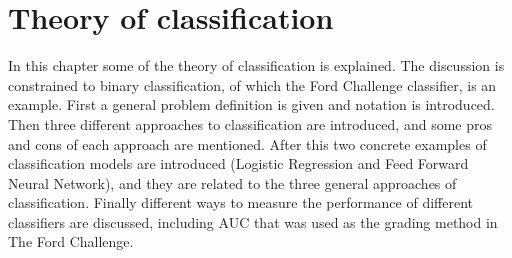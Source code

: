 \chapter{Theory of classification}
In this chapter some of the theory of classification is explained. The discussion is constrained to binary classification, of which the Ford Challenge classifier, is an example. First a general problem definition is given and notation is introduced. Then three different approaches to classification are introduced, and some pros and cons of each approach are mentioned. After this two concrete examples of classification models are introduced (Logistic Regression and Feed Forward Neural Network), and they are related to the three general approaches of classification. Finally different ways to measure the performance of different classifiers are discussed, including AUC that was used as the grading method in The Ford Challenge.

